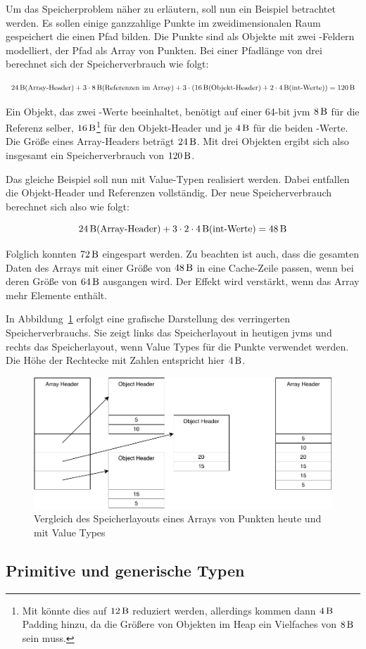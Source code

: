 
Um das Speicherproblem näher zu erläutern, soll nun ein Beispiel betrachtet werden.
Es sollen einige ganzzahlige Punkte im zweidimensionalen Raum gespeichert die einen Pfad bilden.
Die Punkte sind als Objekte mit zwei -Feldern modelliert, der Pfad als Array von Punkten.
Bei einer Pfadlänge von drei berechnet sich der Speicherverbrauch wie folgt:

\[ \SI{24}{\byte} \text{(Array-Header)} + 3 \cdot \SI{8}{\byte} \text{(Referenzen im Array)} + 3 \cdot (\SI{16}{\byte} \text{(Objekt-Header)} + 2 \cdot \SI{4}{\byte} \text{(int-Werte)}) = \SI{120}{\byte} \]

Ein Objekt, das zwei -Werte beeinhaltet, benötigt auf einer 64-bit \ac{jvm} $\SI{8}{\byte}$ für die Referenz selber, $\SI{16}{\byte}$\footnote{Mit  könnte dies auf $\SI{12}{\byte}$ reduziert werden, allerdings kommen dann $\SI{4}{\byte}$ Padding hinzu, da die Größere von Objekten im Heap ein Vielfaches von $\SI{8}{\byte}$ sein muss.} für den Objekt-Header und je $\SI{4}{\byte}$ für die beiden -Werte.
Die Größe eines Array-Headers beträgt $\SI{24}{\byte}$.
Mit drei Objekten ergibt sich also insgesamt ein Speicherverbrauch von $\SI{120}{\byte}$.

Das gleiche Beispiel soll nun mit Value-Typen realisiert werden.
Dabei entfallen die Objekt-Header und Referenzen vollständig.
Der neue Speicherverbrauch berechnet sich also wie folgt:

\[ \SI{24}{\byte} \text{(Array-Header)} + 3 \cdot 2 \cdot \SI{4}{\byte} \text{(int-Werte)} = \SI{48}{\byte} \]

Folglich konnten $\SI{72}{\byte}$ eingespart werden.
Zu beachten ist auch, dass die gesamten Daten des Arrays mit einer Größe von $\SI{48}{\byte}$ in eine Cache-Zeile passen, wenn bei deren Größe von $\SI{64}{\byte}$ ausgangen wird.
Der Effekt wird verstärkt, wenn das Array mehr Elemente enthält.

In Abbildung~\ref{fig:memory-usage} erfolgt eine grafische Darstellung des verringerten Speicherverbrauchs.
Sie zeigt links das Speicherlayout in heutigen \acp{jvm} und rechts das Speicherlayout, wenn Value Types für die Punkte verwendet werden.
Die Höhe der Rechtecke mit Zahlen entspricht hier $\SI{4}{\byte}$.

\begin{figure}
    \centering
    \includegraphics{img/memory-usage.pdf}
    \caption{Vergleich des Speicherlayouts eines Arrays von Punkten heute und mit Value Types}
    \label{fig:memory-usage}
\end{figure}

\subsection{Primitive und generische Typen}\label{subsec:primitive-generics}
